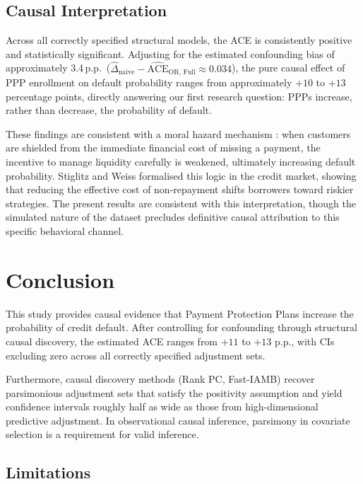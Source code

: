 \documentclass[11pt, a4paper]{article}
\theoremstyle{definition}
\begin{document}
\subsection{Causal Interpretation}

Across all correctly specified structural models, the ACE is consistently positive and
statistically significant. Adjusting for the estimated confounding bias of approximately
3.4\,p.p.\ ($\hat{\Delta}_{\text{naive}} - \widehat{\text{ACE}}_{\text{OR, Full}} \approx
0.034$), the pure causal effect of PPP enrollment on default probability ranges from
approximately $+10$ to $+13$ percentage points, directly answering our first research
question: PPPs increase, rather than decrease, the probability of default.

These findings are consistent with a moral hazard mechanism \cite{arrow1963uncertainty}:
when customers are shielded from the immediate financial cost of missing a payment, the
incentive to manage liquidity carefully is weakened, ultimately increasing default
probability. Stiglitz and Weiss \cite{stiglitz1981credit} formalised this logic in the
credit market, showing that reducing the effective cost of non-repayment shifts borrowers
toward riskier strategies. The present results are consistent with this interpretation,
though the simulated nature of the dataset precludes definitive causal attribution to
this specific behavioral channel.

\section{Conclusion}

This study provides causal evidence that Payment Protection Plans increase the probability
of credit default. After controlling for confounding through structural causal discovery,
the estimated ACE ranges from $+11$ to $+13$ p.p., with CIs excluding zero across all
correctly specified adjustment sets.

Furthermore, causal discovery methods (Rank PC, Fast-IAMB)
recover parsimonious adjustment sets that satisfy the positivity assumption and yield
confidence intervals roughly half as wide as those from high-dimensional predictive
adjustment. In observational causal inference, parsimony in covariate selection is a requirement for valid inference.

\subsection{Limitations}
\end{document}
